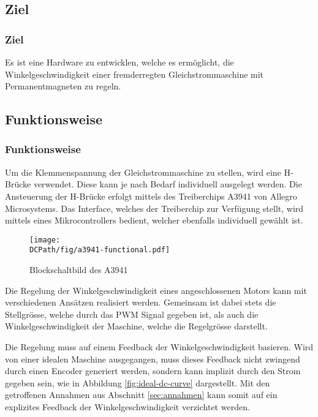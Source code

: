 \ifSTANDALONE
\subsection{Ziel}
\fi
\ifEMBED
\subsubsection{Ziel}
\fi
Es ist eine Hardware zu entwicklen, welche es ermöglicht, die
Winkelgeschwindigkeit einer fremderregten Gleichstrommaschine mit
Permanentmagneten zu regeln.

\ifSTANDALONE
\subsection{Funktionsweise}
\fi
\ifEMBED
\subsubsection{Funktionsweise}
\fi
Um die Klemmenspannung der Gleichstrommaschine zu stellen, wird eine
H-Brücke verwendet. Diese kann je nach Bedarf individuell ausgelegt
werden. Die Ansteuerung der H-Brücke erfolgt mittels des Treiberchips
A3941 von Allegro Microsystems. Das Interface, welches der
Treiberchip zur Verfügung stellt, wird mittels eines Mikrocontrollers
bedient, welcher ebenfalls individuell gewählt ist.

\begin{figure}[h!]
    \centering
    \texttt{[image: \\DCPath/fig/a3941-functional.pdf]}
    \caption[Blockschaltbild des A3941]{Blockschaltbild des A3941 \cite{Datasheet:A3941}}
    \label{fig:a3941-functional}
\end{figure}

\noindent Die Regelung der Winkelgeschwindigkeit eines angeschlossenen Motors 
kann mit verschiedenen Ansätzen realisiert werden. Gemeinsam ist dabei stets die
Stellgrösse, welche durch das PWM Signal gegeben ist, als auch die
Winkelgeschwindigkeit der Maschine, welche die Regelgrösse darstellt.

\noindent Die Regelung muss auf einem Feedback der Winkelgeschwindigkeit 
basieren. Wird von einer idealen Maschine ausgegangen, muss dieses Feedback 
nicht zwingend durch einen Encoder generiert werden, sondern kann implizit 
durch den Strom gegeben sein, wie in Abbildung \ref{fig:ideal-dc-curve} 
dargestellt. Mit den getroffenen Annahmen aus Abschnitt \ref{sec:annahmen} 
kann somit auf ein explizites Feedback der Winkelgeschwindigkeit verzichtet 
werden. 

